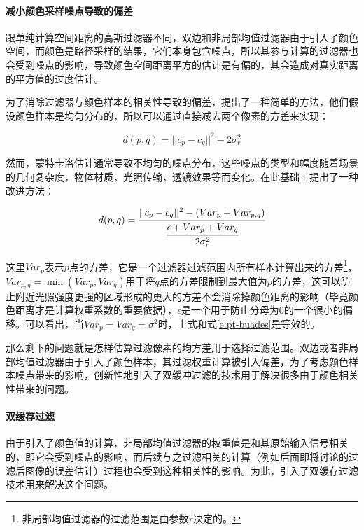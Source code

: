 \paragraph{减小颜色采样噪点导致的偏差}
跟单纯计算空间距离的高斯过滤器不同，双边和非局部均值过滤器由于引入了颜色空间，而颜色是路径采样的结果，它们本身包含噪点，所以其参与计算的过滤器也会受到噪点的影响，导致颜色空间距离平方的估计是有偏的，其会造成对真实距离的平方值的过度估计。

为了消除过滤器与颜色样本的相关性导致的偏差，\cite{a:Areviewofimagedenoisingalgorithmswithanewone}提出了一种简单的方法，他们假设颜色样本是均匀分布的，所以可以通过直接减去两个像素的方差来实现：

\begin{equation}\label{e:pt-buades}
	d(p,q)=||c_p-c_q||^{2}-2\sigma^{2}_r
\end{equation}

然而，蒙特卡洛估计通常导致不均匀的噪点分布，这些噪点的类型和幅度随着场景的几何复杂度，物体材质，光照传输，透镜效果等而变化。\cite{a:AdaptiveRenderingwithNonLocalMeansFiltering}在此基础上提出了一种改进方法：

\begin{equation}
	d(p,q)= \cfrac{||c_p-c_q||^{2}-(Var_p+Var_{p,q})}{ \cfrac{\epsilon+Var_p+Var_q}{2\sigma^{2}_r}}
\end{equation}

\noindent 这里$Var_p$表示$p$点的方差，它是一个过滤器过滤范围内所有样本计算出来的方差\footnote{非局部均值过滤器的过滤范围是由参数$r$决定的。}，$Var_{p,q}=\min (Var_p,Var_q)$用于将$q$点的方差限制到最大值为$p$的方差，这可以防止附近光照强度更强的区域形成的更大的方差不会消除掉颜色距离的影响（毕竟颜色距离才是计算权重系数的重要依据），$\epsilon$是一个用于防止分母为0的一个很小的偏移。可以看出，当$Var_p=Var_q=\sigma^{2}$时，上式和式\ref{e:pt-buades}是等效的。

那么剩下的问题就是怎样估算过滤像素的均方差用于选择过滤范围。双边或者非局部均值过滤器由于引入了颜色样本，其过滤权重计算被引入偏差，为了考虑颜色样本噪点带来的影响，\cite{a:AdaptiveRenderingwithNonLocalMeansFiltering}创新性地引入了双缓冲过滤的技术用于解决很多由于颜色相关性带来的问题。






\paragraph{双缓存过滤}
由于引入了颜色值的计算，非局部均值过滤器的权重值是和其原始输入信号相关的，即它会受到噪点的影响，而后续与之过滤相关的计算（例如后面即将讨论的过滤后图像的误差估计）过程也会受到这种相关性的影响。为此，\cite{a:AdaptiveRenderingwithNonLocalMeansFiltering}引入了双缓存过滤技术用来解决这个问题。


